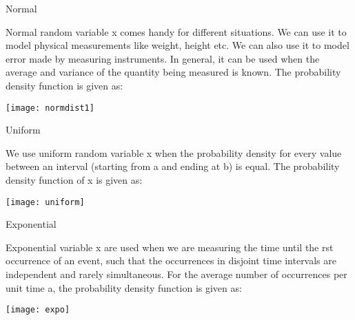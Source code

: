 \begin{frame}{Normal}

Normal random variable x comes handy for different situations. We can
use it to model physical measurements like weight, height etc. We can
also use it to model error made by measuring instruments. In general, it
can be used when the average and variance of the quantity being
measured is known. The probability density function is given as:
\begin{center}
\texttt{[image: normdist1]}
\end{center}
\end{frame}

\begin{frame}{Uniform}

We use uniform random variable x when the probability density for
every value between an interval (starting from a and ending at b) is
equal. The probability density function of x is given as:
\begin{center}
\texttt{[image: uniform]}
\end{center}
\end{frame}

\begin{frame}{Exponential}

Exponential variable x are used when we are measuring the time until
the  rst occurrence of an event, such that the occurrences in disjoint
time intervals are independent and rarely simultaneous. For the
average number of occurrences per unit time a, the probability density
function is given as:
\begin{center}
\texttt{[image: expo]}
\end{center}
\end{frame}

